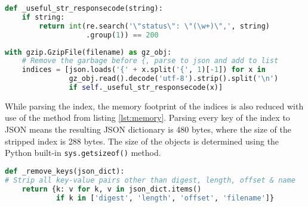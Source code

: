 \begin{lstlisting}[language=Python, caption=Regex solution]
def _useful_str_responsecode(string):
    if string:
        return int(re.search('\"status\": \"(\w+)\",', string)
                   .group(1)) == 200
\end{lstlisting}


\begin{lstlisting}[language=Python, caption=List comprehension creating list of indices, label={lst:comprehension}]
with gzip.GzipFile(filename) as gz_obj:
    # Remove the garbage before {, parse to json and add to list
    indices = [json.loads('{' + x.split('{', 1)[-1]) for x in
               gz_obj.read().decode('utf-8').strip().split('\n')
               if self._useful_str_responsecode(x)]
\end{lstlisting}


While parsing the index, the memory footprint of the indices is also reduced with use of the method from listing \ref{lst:memory}. Parsing every key of the index to JSON means the resulting JSON dictionary is 480 bytes, where the size of the stripped index is 288 bytes. The size of the objects is determined using the Python built-in \texttt{sys.getsizeof()} method. 

\begin{lstlisting}[language=Python, caption=Reducing memory footprint, label={lst:memory}]
def _remove_keys(json_dict):
# Strip all key-value pairs other than digest, length, offset & name
    return {k: v for k, v in json_dict.items()
            if k in ['digest', 'length', 'offset', 'filename']}
\end{lstlisting}
